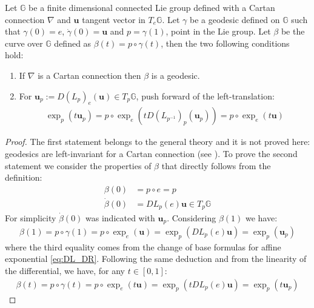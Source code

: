 \begin{prop}
	Let $\mathbb{G}$ be a finite dimensional connected Lie group defined with a Cartan connection $\nabla$ and $\mathbf{u}$ tangent vector in $ T_{e}\mathbb{G}$. Let $\gamma$ be a geodesic defined on $\mathbb{G}$ such that $\gamma(0) = e$, $\dot{\gamma}(0) =\mathbf{u}$ and $p = \gamma(1)$, point in the Lie group. Let $\beta$ be the curve over $\mathbb{G}$ defined as $\beta(t) = p\circ \gamma(t)$, then the two following conditions hold:
	\begin{enumerate}
		\item If $\nabla$ is a Cartan connection then $\beta$ is a geodesic.
		\item For $\mathbf{u}_{p} := D(L_{p})_{e}(\mathbf{u}) \in T_{p}\mathbb{G}$, push forward of the left-translation:
		\begin{align}\label{eq:lemma_pt}
		\exp_{p}(t\mathbf{u}_{p}) = p\circ \exp_{e}( t D(L_{p^{-1}})_{p}(\mathbf{u}_{p}) ) 
		= p\circ \exp_{e}(t\mathbf{u})
		\end{align}
	\end{enumerate}
\end{prop}
\begin{proof}
	The first statement belongs to the general theory and it is not proved here: geodesics are left-invariant for a Cartan connection (see \cite{do1992riemannian}). To prove the second statement we consider the properties of $\beta$ that directly follows from the definition:
	\begin{align*}
		\beta(0) &= p\circ e = p \\
		\dot{\beta}(0) &= DL_{p}(e)\mathbf{u}\in T_{p}\mathbb{G}
	\end{align*}
	For simplicity $\dot{\beta}(0) $ was indicated with $\mathbf{u}_{p}$. Considering $\beta(1)$ we have: 
	\begin{align*}
		   \beta(1) = p\circ \gamma(1) 
						= p\circ \exp_{e}(\mathbf{u}) 
						= \exp_{p}( DL_p(e) \mathbf{u} ) 
						= \exp_{p}( \mathbf{u}_{p} ) 
	\end{align*}
	where the third equality comes from the change of base formulas for affine exponential \ref{eq:DL_DR}. Following the same deduction and from the linearity of the differential, we have, for any $t\in [ 0,1 ]$:
	\begin{align*}
	\beta(t) = p\circ \gamma(t) 
	= p\circ \exp_{e}(t\mathbf{u}) 
	= \exp_{p}( tDL_p(e) \mathbf{u} ) 
	= \exp_{p}( t\mathbf{u}_{p} ) 
	\end{align*}
\end{proof}

